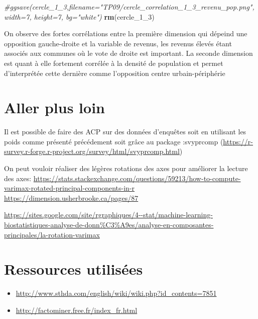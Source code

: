 \documentclass[
]{book}
\newenvironment{Shaded}{\begin{snugshade}}{\end{snugshade}}
\newcommand{\CommentTok}[1]{\textcolor[rgb]{0.56,0.35,0.01}{\textit{#1}}}
\newcommand{\FunctionTok}[1]{\textcolor[rgb]{0.13,0.29,0.53}{\textbf{#1}}}
\newcommand{\NormalTok}[1]{#1}
\begin{document}
\begin{Shaded}
\begin{Highlighting}[]
\CommentTok{\#ggsave(cercle\_1\_3,filename="TP09/cercle\_correlation\_1\_3\_revenu\_pop.png", width=7, height=7, bg="white")}
\FunctionTok{rm}\NormalTok{(cercle\_1\_3)}
\end{Highlighting}
\end{Shaded}

On observe des fortes corrélations entre la première dimension qui dépeind une opposition gauche-droite et la variable de revenus, les revenus élevés étant associés aux communes où le vote de droite est important. La seconde dimension est quant à elle fortement corrélée à la densité de population et permet d'interprétée cette dernière comme l'opposition centre urbain-périphérie

\hypertarget{aller-plus-loin}{%
\section{Aller plus loin}\label{aller-plus-loin}}

Il est possible de faire des ACP sur des données d'enquêtes soit en utilisant les poids comme présenté précédement soit grâce au package :svyprcomp (\url{https://r-survey.r-forge.r-project.org/survey/html/svyprcomp.html})

On peut vouloir réaliser des légères rotations des axes pour améliorer la lecture des axes: \href{https://stats.stackexchange.com/questions/59213/how-to-compute-varimax-rotated-principal-components-in-r\%20https://dimension.usherbrooke.ca/pages/87}{https://stats.stackexchange.com/questions/59213/how-to-compute-varimax-rotated-principal-components-in-r https://dimension.usherbrooke.ca/pages/87}

\url{https://sites.google.com/site/rgraphiques/4--stat/machine-learning-biostatistiques-analyse-de-donn\%C3\%A9es/analyse-en-composantes-principales/la-rotation-varimax}

\hypertarget{ressources-utilisuxe9es}{%
\section{Ressources utilisées}\label{ressources-utilisuxe9es}}

\begin{itemize}
\item
  \url{http://www.sthda.com/english/wiki/wiki.php?id_contents=7851}
\item
  \url{http://factominer.free.fr/index_fr.html}
\end{itemize}
\end{document}
